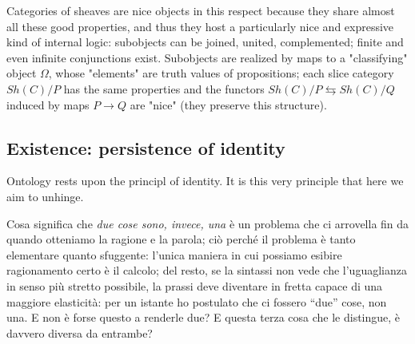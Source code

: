 \documentclass{amsart}
\begin{document}
Categories of sheaves are nice objects in this respect because they share almost all these good properties, and thus they host a particularly nice and expressive kind of internal logic: subobjects can be joined, united, complemented; finite and even infinite conjunctions exist. Subobjects are realized by maps to a "classifying" object $\Omega$, whose "elements" are truth values of propositions; each slice category $Sh(C)/P$ has the same properties and the functors $Sh(C)/P \leftrightarrows Sh(C)/Q$ induced by maps $P\to Q$ are "nice" (they preserve this structure).
\subsection{Existence: persistence of identity}
Ontology rests upon the principl of identity. It is this very principle that here we aim to unhinge.

Cosa significa che \emph{due cose sono, invece, una} è un problema che ci arrovella fin da quando otteniamo la ragione e la parola; ciò perché il problema è tanto elementare quanto sfuggente: l'unica maniera in cui possiamo esibire ragionamento certo è il calcolo; del resto, se la sintassi non vede che l'uguaglianza in senso più stretto possibile, la prassi deve diventare in fretta capace di una maggiore elasticità: per un istante ho postulato che ci fossero ``due'' cose, non una. E non è forse questo a renderle due? E questa terza cosa che le distingue, è davvero diversa da entrambe?
\end{document}
